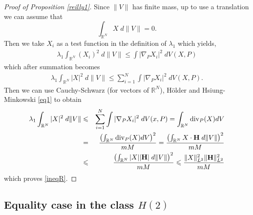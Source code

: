 \documentclass[12pt,english]{smfart} %
\newtheorem{proposition}[theorem]{Proposition}
\theoremstyle{remark}
\newcommand{\Hm}{{\bf H}}
\begin{document}
 
 

\begin{proof}[Proof of Proposition \ref{reilly1}]
Since  $\|V\|$ has finite mass,    up to use a translation we can assume that
$$ \int_{\mathbb{R}^N}X \; d \|V\|=0.$$
 Then we take $X_i$ as a test function in the definition of $\lambda_1$ which yields,
 \begin{eqnarray}
 \lambda_1 \int_{\mathbb{R}^N} (X_i)^2 \;d \|V\| \leqslant \int |\nabla_P X_i|^2 \; dV(X,P) \label{lambda1X}
 \end{eqnarray}
 which after summation becomes
 \begin{eqnarray}
 \lambda_1 \int_{\mathbb{R}^N} |X|^2  \;d \|V\| \leqslant \sum_{i=1}^{N}\int  |\nabla_P X_i|^2 \; dV(X,P). \label{ineq11}
 \end{eqnarray}
 Then we can use Cauchy-Schwarz (for vectors of $\mathbb{R}^N$), H\"older and  Hsiung-Minkowski \eqref{eq1} to obtain
\begin{eqnarray}
 \lambda_1 \int_{\mathbb{R}^N} |X|^2  \;d \|V\| &\leqslant& \sum_{i=1}^{N}\int |\nabla_P X_i|^2 \; dV(x,P)=  \int_{\mathbb{R}^N} {\rm div}_P(X)dV \label{ligne1}\\
 &=& \frac{\left( \int_{\mathbb{R}^N} {\rm div}_P(X)dV\right)^2}{mM} = \frac{\left(\int_{\mathbb{R}^N} X \cdot {\bf H}\;d\| V\| \right)^2}{mM}  \notag \\
 &\leqslant &  \frac{ \left( \int_{\mathbb{R}^N} |X | |\Hm | \;d\|V\|  \right)^2}{mM} \leqslant   \frac{\|X\|_{L^2}^2 \|{\bf H}\|_{L^2}^2}{mM} \notag
 \end{eqnarray}
 which proves \eqref{ineqR}.
  \end{proof}
  


\subsection{Equality case in the class $H(2)$} 
\end{document}
